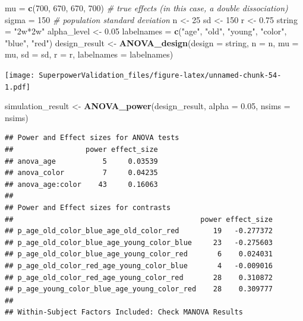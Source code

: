 \documentclass[]{book}
\newenvironment{Shaded}{\begin{snugshade}}{\end{snugshade}}
\newcommand{\CommentTok}[1]{\textcolor[rgb]{0.56,0.35,0.01}{\textit{#1}}}
\newcommand{\DataTypeTok}[1]{\textcolor[rgb]{0.13,0.29,0.53}{#1}}
\newcommand{\DecValTok}[1]{\textcolor[rgb]{0.00,0.00,0.81}{#1}}
\newcommand{\FloatTok}[1]{\textcolor[rgb]{0.00,0.00,0.81}{#1}}
\newcommand{\KeywordTok}[1]{\textcolor[rgb]{0.13,0.29,0.53}{\textbf{#1}}}
\newcommand{\NormalTok}[1]{#1}
\newcommand{\StringTok}[1]{\textcolor[rgb]{0.31,0.60,0.02}{#1}}
\begin{document}
\begin{Shaded}
\begin{Highlighting}[]
\NormalTok{mu =}\StringTok{ }\KeywordTok{c}\NormalTok{(}\DecValTok{700}\NormalTok{, }\DecValTok{670}\NormalTok{, }\DecValTok{670}\NormalTok{, }\DecValTok{700}\NormalTok{) }\CommentTok{# true effects (in this case, a double dissociation)}
\NormalTok{sigma =}\StringTok{ }\DecValTok{150}  \CommentTok{# population standard deviation}
\NormalTok{n <-}\StringTok{ }\DecValTok{25}
\NormalTok{sd <-}\StringTok{ }\DecValTok{150}
\NormalTok{r <-}\StringTok{ }\FloatTok{0.75}
\NormalTok{string =}\StringTok{ "2w*2w"}
\NormalTok{alpha_level <-}\StringTok{ }\FloatTok{0.05}
\NormalTok{labelnames =}\StringTok{ }\KeywordTok{c}\NormalTok{(}\StringTok{"age"}\NormalTok{, }\StringTok{"old"}\NormalTok{, }\StringTok{"young"}\NormalTok{, }\StringTok{"color"}\NormalTok{, }\StringTok{"blue"}\NormalTok{, }\StringTok{"red"}\NormalTok{)}
\NormalTok{design_result <-}\StringTok{ }\KeywordTok{ANOVA_design}\NormalTok{(}\DataTypeTok{design =}\NormalTok{ string,}
                              \DataTypeTok{n =}\NormalTok{ n, }
                              \DataTypeTok{mu =}\NormalTok{ mu, }
                              \DataTypeTok{sd =}\NormalTok{ sd, }
                              \DataTypeTok{r =}\NormalTok{ r, }
                              \DataTypeTok{labelnames =}\NormalTok{ labelnames)}
\end{Highlighting}
\end{Shaded}

\texttt{[image: SuperpowerValidation\_files/figure-latex/unnamed-chunk-54-1.pdf]}

\begin{Shaded}
\begin{Highlighting}[]
\NormalTok{simulation_result <-}\StringTok{ }\KeywordTok{ANOVA_power}\NormalTok{(design_result, }\DataTypeTok{alpha =} \FloatTok{0.05}\NormalTok{, }\DataTypeTok{nsims =}\NormalTok{ nsims)}
\end{Highlighting}
\end{Shaded}

\begin{verbatim}
## Power and Effect sizes for ANOVA tests
##                 power effect_size
## anova_age           5     0.03539
## anova_color         7     0.04235
## anova_age:color    43     0.16063
## 
## Power and Effect sizes for contrasts
##                                            power effect_size
## p_age_old_color_blue_age_old_color_red        19   -0.277372
## p_age_old_color_blue_age_young_color_blue     23   -0.275603
## p_age_old_color_blue_age_young_color_red       6    0.024031
## p_age_old_color_red_age_young_color_blue       4   -0.009016
## p_age_old_color_red_age_young_color_red       28    0.310872
## p_age_young_color_blue_age_young_color_red    28    0.309777
## 
## Within-Subject Factors Included: Check MANOVA Results
\end{verbatim}
\end{document}
